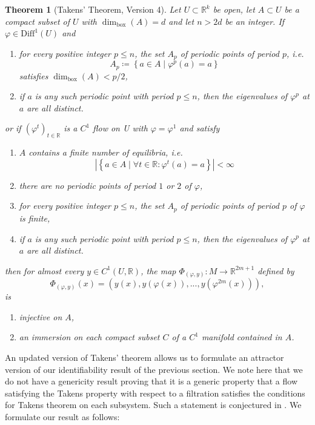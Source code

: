 \documentclass[11pt, a4paper]{memoir}
\theoremstyle{break}
\newtheorem{thm}{Theorem}
\theoremstyle{break}
\theoremstyle{nonumberplain}
\newcommand{\mR}{\mathbb{R}}
\newcommand{\abs}[1]{\left| #1\right|}
\begin{document}
\begin{thm}[Takens' Theorem, Version 4]\label{v4}
Let $U\subset \mR^k$ be open, let $A\subset U$ be a compact subset of $U$ with $\dim_\text{box}(A)=d$ and let $n>2d$ be an integer. If $\varphi\in\text{Diff}^1(U)$ and
\begin{enumerate}[label=(\roman*)]
	\item for every positive integer $p\leqslant n$, the set $A_p$ of periodic points of period $p$, i.e.
	$$A_p\coloneqq \left\{a\in A\mid \varphi^p(a)=a\right\}$$
	satisfies $\dim_\text{box}(A)<p/2$,
	\item if $a$ is any such periodic point with period $p\leqslant n$, then the eigenvalues of $\varphi^p$ at $a$ are all distinct.
\end{enumerate}
or if $(\varphi^t)_{t\in \mR}$ is a $C^1$ flow on U with $\varphi=\varphi^1$ and satisfy
\begin{enumerate}[label=(\roman*)]
	\item $A$ contains a finite number of equilibria, i.e.
	$$\abs{\left\{a\in A\mid \forall
	 t\in \mR: \varphi^t(a)=a\right\}}<\infty$$
	 \item there are no periodic points of period $1$ or $2$ of $\varphi$,
	\item for every positive integer $p\leqslant n$, the set $A_p$ of periodic points of period $p$ of $\varphi$ is finite,
	\item if $a$ is any such periodic point with period $p\leqslant n$, then the eigenvalues of $\varphi^p$ at $a$ are all distinct.
\end{enumerate}
then for almost every $y\in C^1(U,\mR)$, the map $\Phi_{(\varphi,y)}:M\to \mathbb{R}^{2m+1}$ defined by
$$\Phi_{(\varphi,y)}(x)=(y(x),y(\varphi(x)),...,y(\varphi^{2m}(x))),$$
is
\begin{enumerate}[label=(\roman*)]
	\item injective on $A$,
	\item an immersion on each compact subset $C$ of a $C^1$ manifold contained in $A$.
\end{enumerate}
\end{thm} 
An updated version of Takens' theorem allows us to formulate an attractor version of our identifiability result of the previous section. We note here that we do not have a genericity result proving that it is a generic property that a flow satisfying the Takens property with respect to a filtration satisfies the conditions for Takens theorem on each subsystem. Such a statement is conjectured in \cite{mathFound}. We formulate our result as follows:
\end{document}
